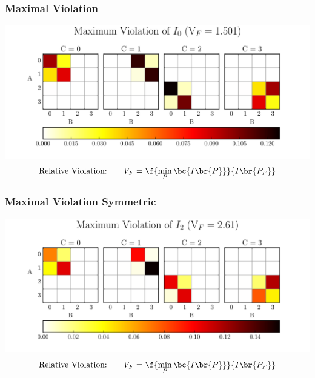 \documentclass[
    hyperref={bookmarks=false},%
    xcolor={dvipsnames},
]{beamer}
\begin{document}
\begin{frame}
    \frametitle{Maximal Violation}
    \includegraphics[width=\linewidth]{../../figures/distributions/plotted_dist_I_0_max_violation.pdf}
    \[ \text{Relative Violation:} \qquad V_F = \f{\min_P\bc{I\br{P}}}{I\br{P_F}} \]
\end{frame}

\begin{frame}
    \frametitle{Maximal Violation Symmetric}
    \includegraphics[width=\linewidth]{../../figures/distributions/plotted_dist_I_2_max_violation.pdf}
    \[ \text{Relative Violation:} \qquad V_F = \f{\min_P\bc{I\br{P}}}{I\br{P_F}} \]
\end{frame}
\end{document}
